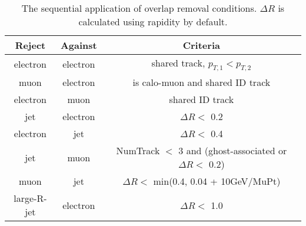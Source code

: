 \begin{table}[ht]
\caption{The sequential application of overlap removal conditions. $\Delta R$ is calculated using rapidity by default.}
\label{tab:OR}
\begin{center}
\small
\begin{tabular}{|c|c|c|}
\hline
 Reject & Against & Criteria \\\hline
 electron & electron & shared track, $p_{T,1} < p_{T,2}$ \\
 muon     & electron & is calo-muon and shared ID track \\
 electron & muon     & shared ID track \\
 jet      & electron & $\Delta R <$ 0.2 \\ %
 electron & jet      & $\Delta R <$ 0.4 \\
 jet      & muon     & NumTrack $<$ 3 and (ghost-associated or $\Delta R <$ 0.2) \\
 muon     & jet      & $\Delta R <$ min(0.4, 0.04 + 10GeV/MuPt) \\ %
 large-R-jet  & electron & $\Delta R <$ 1.0 \\
\hline
\end{tabular}
\end{center}
\end{table}


